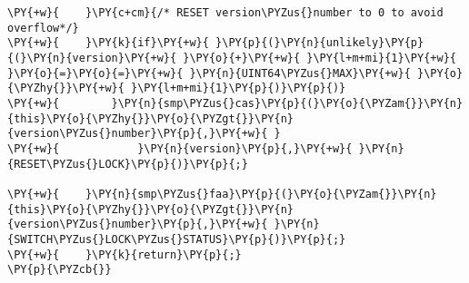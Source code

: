 \begin{Verbatim}[commandchars=\\\{\},codes={\catcode`\$=3\catcode`\^=7\catcode`\_=8\relax}]
\PY{+w}{    }\PY{c+cm}{/* RESET version\PYZus{}number to 0 to avoid overflow*/}
\PY{+w}{    }\PY{k}{if}\PY{+w}{ }\PY{p}{(}\PY{n}{unlikely}\PY{p}{(}\PY{n}{version}\PY{+w}{ }\PY{o}{+}\PY{+w}{ }\PY{l+m+mi}{1}\PY{+w}{ }\PY{o}{=}\PY{o}{=}\PY{+w}{ }\PY{n}{UINT64\PYZus{}MAX}\PY{+w}{ }\PY{o}{\PYZhy{}}\PY{+w}{ }\PY{l+m+mi}{1}\PY{p}{)}\PY{p}{)}
\PY{+w}{        }\PY{n}{smp\PYZus{}cas}\PY{p}{(}\PY{o}{\PYZam{}}\PY{n}{this}\PY{o}{\PYZhy{}}\PY{o}{\PYZgt{}}\PY{n}{version\PYZus{}number}\PY{p}{,}\PY{+w}{ }
\PY{+w}{            }\PY{n}{version}\PY{p}{,}\PY{+w}{ }\PY{n}{RESET\PYZus{}LOCK}\PY{p}{)}\PY{p}{;}

\PY{+w}{    }\PY{n}{smp\PYZus{}faa}\PY{p}{(}\PY{o}{\PYZam{}}\PY{n}{this}\PY{o}{\PYZhy{}}\PY{o}{\PYZgt{}}\PY{n}{version\PYZus{}number}\PY{p}{,}\PY{+w}{ }\PY{n}{SWITCH\PYZus{}LOCK\PYZus{}STATUS}\PY{p}{)}\PY{p}{;}
\PY{+w}{    }\PY{k}{return}\PY{p}{;}
\PY{p}{\PYZcb{}}
\end{Verbatim}
